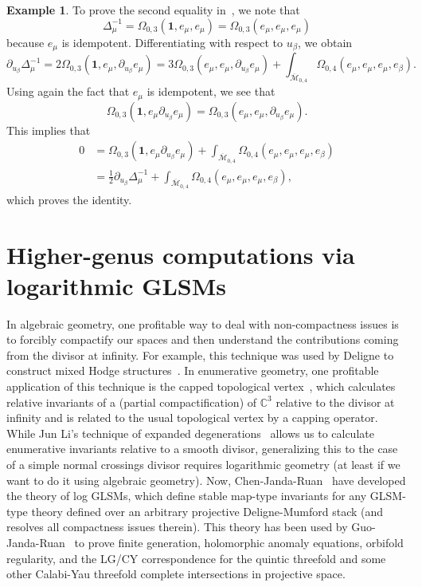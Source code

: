 \documentclass[10pt]{amsart}
\theoremstyle{definition}
\newtheorem{exm}[thm]{Example}
\theoremstyle{remark}
\theoremstyle{plain}
\theoremstyle{definition}
\theoremstyle{remark}
\newcommand{\C}{\mathbb{C}}
\newcommand{\Mbar}{\overline{\mathcal{M}}}
\newcommand{\1}{\mathbf{1}}
\newcommand{\2}{\mathbf{2}}
\newcommand{\3}{\mathbf{3}}
\begin{document}
\begin{exm}
To prove the second equality in~, we note that
\[ \Delta_{\mu}^{-1} = \Omega_{0,3}(\1, e_{\mu}, e_{\mu}) = \Omega_{0,3}(e_{\mu}, e_{\mu}, e_{\mu}) \]
because $e_{\mu}$ is idempotent. Differentiating with respect to $u_{\beta}$, we obtain
\[ \partial_{u_{\beta}} \Delta_{\mu}^{-1} = 2 \Omega_{0,3}(\1,e_{\mu}, \partial_{u_{\beta}} e_{\mu}) = 3 \Omega_{0,3}(e_{\mu}, e_{\mu}, \partial_{u_{\beta}}e_{\mu}) + \int_{\Mbar_{0,4}}\Omega_{0,4}(e_{\mu}, e_{\mu}, e_{\mu}, e_{\beta}). \]
Using again the fact that $e_{\mu}$ is idempotent, we see that 
\[ \Omega_{0,3}(\1, e_{\mu} \partial_{u_{\beta}} e_{\mu}) = \Omega_{0,3}(e_{\mu}, e_{\mu}, \partial_{u_{\beta}}e_{\mu}). \]
This implies that
\begin{align*}
    0 &= \Omega_{0,3}(\1, e_{\mu} \partial_{u_{\beta}} e_{\mu}) + \int_{\Mbar_{0,4}} \Omega_{0,4}(e_{\mu}, e_{\mu}, e_{\mu}, e_{\beta}) \\
    &= \frac{1}{2} \partial_{u_{\beta}} \Delta_{\mu}^{-1} + \int_{\Mbar_{0,4}} \Omega_{0,4}(e_{\mu}, e_{\mu}, e_{\mu}, e_{\beta}), 
\end{align*}
which proves the identity.
\end{exm}

\part{Higher-genus computations via logarithmic GLSMs}
\label{pt:logglsm}

In algebraic geometry, one profitable way to deal with non-compactness issues is to forcibly compactify our spaces and then understand the contributions coming from the divisor at infinity. For example, this technique was used by Deligne to construct mixed Hodge structures~\cite{ht2}. In enumerative geometry, one profitable application of this technique is the capped topological vertex~\cite{dtloccurve}, which calculates relative invariants of a (partial compactification) of $\C^3$ relative to the divisor at infinity and is related to the usual topological vertex by a capping operator. While Jun Li's technique of expanded degenerations~\cite{expdeg} allows us to calculate enumerative invariants relative to a smooth divisor, generalizing this to the case of a simple normal crossings divisor requires logarithmic geometry (at least if we want to do it using algebraic geometry). Now, Chen-Janda-Ruan~\cite{logglsm} have developed the theory of log GLSMs, which define stable map-type invariants for any GLSM-type theory defined over an arbitrary projective Deligne-Mumford stack (and resolves all compactness issues therein). This theory has been used by Guo-Janda-Ruan~\cite{bcovlogglsm} to prove finite generation, holomorphic anomaly equations, orbifold regularity, and the LG/CY correspondence for the quintic threefold and some other Calabi-Yau threefold complete intersections in projective space.
\end{document}

